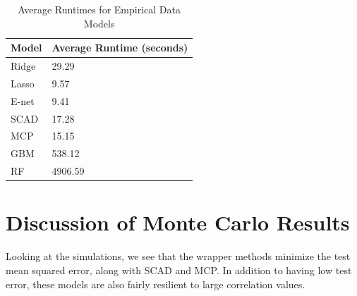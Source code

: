 \documentclass{article}
\begin{document}
\begin{table}[h!]
	\centering
	\caption{Average Runtimes for Empirical Data Models}
	\label{tab:emp_runtimes}
	\begin{tabular}{ll}
		\hline
		\textbf{Model}        & \textbf{Average Runtime} (seconds) \\ \hline
		Ridge         & 29.29               \\
		Lasso         & 9.57                \\
		E-net	      & 9.41                \\
		SCAD          & 17.28               \\
		MCP           & 15.15               \\
		GBM      	  & 538.12              \\
		RF 			  & 4906.59             \\ \hline
	\end{tabular}
\end{table}

\section{Discussion of Monte Carlo Results}
Looking at the simulations, we see that the wrapper methods minimize the test mean squared error, along with SCAD and MCP. In addition to having low test error, these models are also fairly resilient to large correlation values.

\end{document}
